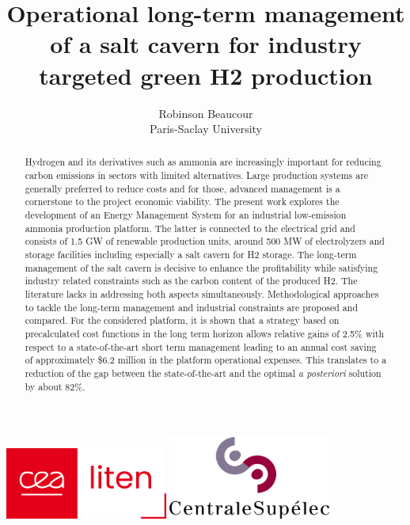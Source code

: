 \documentclass{article}
\begin{document}
\title{Operational long-term management of a salt cavern for industry targeted green H2 production}

\author{Robinson Beaucour \\Paris-Saclay University}

\maketitle


\begin{center}
    \includegraphics[width=0.4\textwidth]{03_Images/LITEN.png}
    \hspace{0.05\textwidth}
    \includegraphics[width=0.4\textwidth]{03_Images/LogoCS.png}
\end{center}

\begin{abstract}
    \small
    Hydrogen and its derivatives such as ammonia are increasingly important for reducing carbon emissions in sectors with limited alternatives. Large production systems are generally preferred to reduce costs and for those, advanced management is a cornerstone to the project economic viability.
    The present work explores the development of an Energy Management System for an industrial low-emission ammonia production platform. The latter is connected to the electrical grid and consists of 1.5 GW of renewable production units, around 500 MW of electrolyzers and storage facilities including especially a salt cavern for H2 storage. The long-term management of the salt cavern is decisive to enhance the profitability while satisfying industry related constraints such as the carbon content of the produced H2. The literature lacks in addressing both aspects simultaneously. 
    Methodological approaches to tackle the long-term management and industrial constraints are proposed and compared. For the considered platform, it is shown that a strategy based on precalculated cost functions in the long term horizon allows relative gains of 2.5\% with respect to a state-of-the-art short term management leading to an annual cost saving of approximately \$6.2 million in the platform operational expenses. This translates to a reduction of the gap between the state-of-the-art and the optimal \textit{a posteriori} solution by about 82\%.
\end{abstract}
\end{document}
